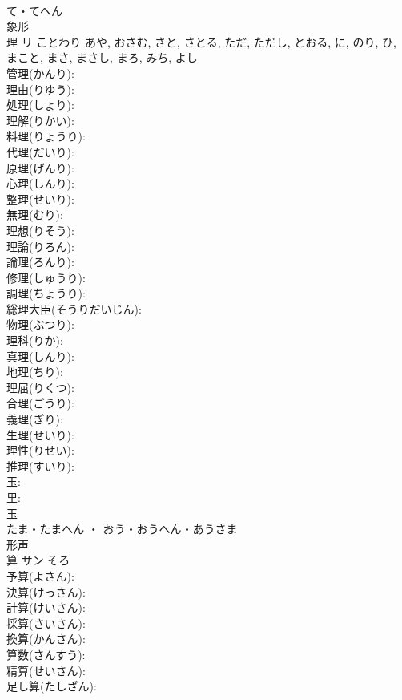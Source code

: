 \documentclass[8pt]{extreport}
\begin{document}
\begin{CJK}{UTF8}{min}
\\	て・てへん	
\\	象形 
\\	理	リ	ことわり	あや, おさむ, さと, さとる, ただ, ただし, とおる, に, のり, ひ, まこと, まさ, まさし, まろ, みち, よし	
\\	管理(かんり): 
\\	理由(りゆう): 
\\	処理(しょり): 
\\	理解(りかい): 
\\	料理(りょうり): 
\\	代理(だいり): 
\\	原理(げんり): 
\\	心理(しんり): 
\\	整理(せいり): 
\\	無理(むり): 
\\	理想(りそう): 
\\	理論(りろん): 
\\	論理(ろんり): 
\\	修理(しゅうり): 
\\	調理(ちょうり): 
\\	総理大臣(そうりだいじん): 
\\	物理(ぶつり): 
\\	理科(りか): 
\\	真理(しんり): 
\\	地理(ちり): 
\\	理屈(りくつ): 
\\	合理(ごうり): 
\\	義理(ぎり): 
\\	生理(せいり): 
\\	理性(りせい): 
\\	推理(すいり): 
\\	玉: 
\\	里: 
\\	玉	
\\	たま・たまへん ・ おう・おうへん・あうさま	
\\	形声 
\\	算	サン	そろ		
\\	予算(よさん): 
\\	決算(けっさん): 
\\	計算(けいさん): 
\\	採算(さいさん): 
\\	換算(かんさん): 
\\	算数(さんすう): 
\\	精算(せいさん): 
\\	足し算(たしざん): 

\end{CJK}
\end{document}
